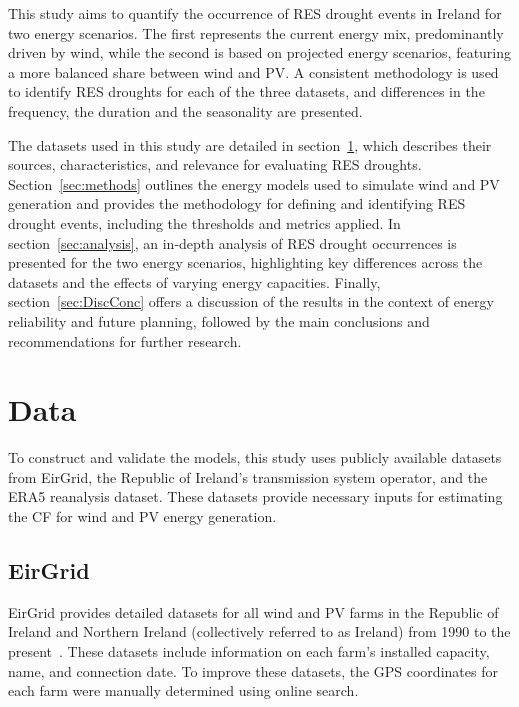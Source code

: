 \documentclass[a4paper, 11pt]{article}
\begin{document}
This study aims to quantify the occurrence of RES drought events in Ireland for two energy scenarios. The first represents the current energy mix, predominantly driven by wind, while the second is based on projected energy scenarios, featuring a more balanced share between wind and PV. A consistent methodology is used to identify RES droughts for each of the three datasets, and differences in the frequency, the duration and the seasonality are presented. 

The datasets used in this study are detailed in section~\ref{sec:data}, which describes their sources, characteristics, and relevance for evaluating RES droughts. Section~\ref{sec:methods} outlines the energy models used to simulate wind and PV generation and provides the methodology for defining and identifying RES drought events, including the thresholds and metrics applied. In section~\ref{sec:analysis}, an in-depth analysis of RES drought occurrences is presented for the two energy scenarios, highlighting key differences across the datasets and the effects of varying energy capacities. Finally, section~\ref{sec:DiscConc} offers a discussion of the results in the context of energy reliability and future planning, followed by the main conclusions and recommendations for further research.

\section{Data}
\label{sec:data}

To construct and validate the models, this study uses publicly available datasets from EirGrid, the Republic of Ireland's transmission system operator, and the ERA5 reanalysis dataset. These datasets provide necessary inputs for estimating the CF for wind and PV energy generation.

\subsection{EirGrid}
\label{sec:eirgrid}

EirGrid provides detailed datasets for all wind and PV farms in the Republic of Ireland and Northern Ireland (collectively referred to as Ireland) from 1990 to the present~\cite{eirgrid}. These datasets include information on each farm’s installed capacity, name, and connection date. To improve these datasets, the GPS coordinates for each farm were manually determined using online search.
\end{document}
